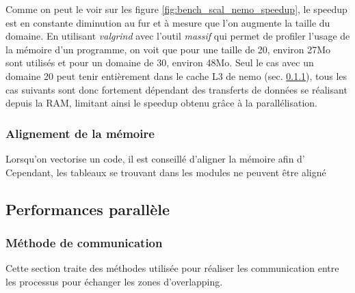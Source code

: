Comme on peut le voir sur les figure \ref{fig:bench_scal_nemo_speedup}, le speedup est en constante diminution au fur et à mesure que l'on augmente la taille du domaine. En utilisant \textit{valgrind} avec l'outil \textit{massif} qui permet de profiler l'usage de la mémoire d'un programme, on voit que pour une taille de 20, environ 27Mo sont utilisés et pour un domaine de 30, environ 48Mo. Seul le cas avec un domaine 20 peut tenir entièrement dans le cache L3 de nemo (sec. \ref{}), tous les cas suivants sont donc fortement dépendant des transferts de données se réalisant depuis la RAM, limitant ainsi le speedup obtenu grâce à la parallélisation.

\subsubsection{Alignement de la mémoire}
Lorsqu'on vectorise un code, il est conseillé d'aligner la mémoire afin d'
Cependant, les tableaux se trouvant dans les modules ne peuvent être aligné



\subsection{Performances parallèle}


\subsubsection{Méthode de communication}
Cette section traite des méthodes utilisée pour réaliser les communication entre les processus pour échanger les zones d'overlapping.








